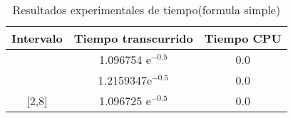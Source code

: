 \begin{table}[!ht]
\begin{center}
\begin{tabular}{|c||c||c|} \hline 
\textbf{Intervalo} & \textbf{Tiempo transcurrido}  & \textbf{Tiempo CPU}\\ \hline \hline
[-1,1] &  1.096754 $\text{e}^{-0.5}$& 0.0
\\
\hline
[-1,4] & 1.2159347$\text{e}^{-0.5}$ & 0.0
\\
\hline

[2,8] & 1.096725 $\text{e}^{-0.5}$& 0.0
\\
\hline
\hline

\end{tabular}
\end{center}
\caption{Resultados experimentales de tiempo(formula simple)}
\label{tab:3}
\end{table}
